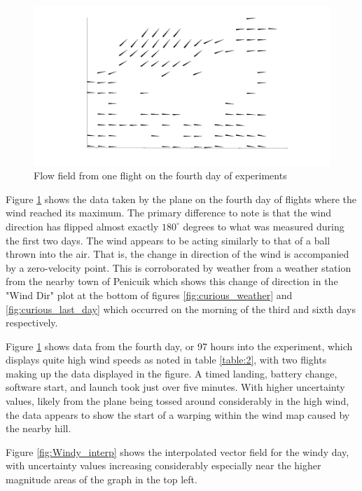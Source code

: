 \documentclass[12pt]{report}
\begin{document}
\begin{figure}[!ht]
	\centering
	\includegraphics[scale=0.2]{Windy_raw.jpg}
	\caption{Flow field from one flight on the fourth day of experiments}
	\label{fig:Windy_raw}
\end{figure}

Figure \ref{fig:Windy_raw} shows the data taken by the plane on the fourth day of flights where the wind reached its maximum. The primary difference to note is that the wind direction has flipped almost exactly $180^\circ$ degrees to what was measured during the first two days. The wind appears to be acting similarly to that of a ball thrown into the air. That is, the change in direction of the wind is accompanied by a zero-velocity point. This is corroborated by weather from a weather station from the nearby town of Penicuik which shows this change of direction in the "Wind Dir" plot at the bottom of figures \ref{fig:curious_weather} and \ref{fig:curious_last_day} which occurred on the morning of the third and sixth days respectively.

Figure \ref{fig:Windy_raw} shows data from the fourth day, or 97 hours into the experiment, which displays quite high wind speeds as noted in table \ref{table:2}, with two flights making up the data displayed in the figure. A timed landing, battery change, software start, and launch took just over five minutes. With higher uncertainty values, likely from the plane being tossed around considerably in the high wind, the data appears to show the start of a warping within the wind map caused by the nearby hill. 

Figure \ref{fig:Windy_interp} shows the interpolated vector field for the windy day, with uncertainty values increasing considerably especially near the higher magnitude areas of the graph in the top left.
\end{document}
